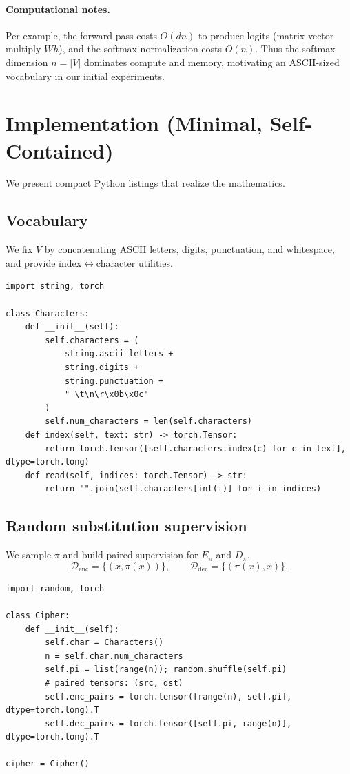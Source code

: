 \documentclass[12pt]{article}
\begin{document}
\paragraph{Computational notes.}
Per example, the forward pass costs $O(dn)$ to produce logits (matrix-vector multiply $W h$), and the softmax normalization costs $O(n)$. Thus the softmax dimension $n=|V|$ dominates compute and memory, motivating an ASCII-sized vocabulary in our initial experiments.

\section{Implementation (Minimal, Self-Contained)}
We present compact Python listings that realize the mathematics.

\subsection{Vocabulary}
We fix $V$ by concatenating ASCII letters, digits, punctuation, and whitespace, and provide index$\leftrightarrow$character utilities.
\begin{verbatim}
import string, torch

class Characters:
    def __init__(self):
        self.characters = (
            string.ascii_letters + 
            string.digits + 
            string.punctuation + 
            " \t\n\r\x0b\x0c"
        )
        self.num_characters = len(self.characters)
    def index(self, text: str) -> torch.Tensor:
        return torch.tensor([self.characters.index(c) for c in text], dtype=torch.long)
    def read(self, indices: torch.Tensor) -> str:
        return "".join(self.characters[int(i)] for i in indices)
\end{verbatim}

\subsection{Random substitution supervision}
We sample $\pi$ and build paired supervision for $E_\pi$ and $D_\pi$.
\[
\mathcal{D}_{\text{enc}}=\{(x,\pi(x))\},\qquad
\mathcal{D}_{\text{dec}}=\{(\pi(x),x)\}.
\]
\begin{verbatim}
import random, torch

class Cipher:
    def __init__(self):
        self.char = Characters()
        n = self.char.num_characters
        self.pi = list(range(n)); random.shuffle(self.pi)
        # paired tensors: (src, dst)
        self.enc_pairs = torch.tensor([range(n), self.pi], dtype=torch.long).T
        self.dec_pairs = torch.tensor([self.pi, range(n)], dtype=torch.long).T

cipher = Cipher()
\end{verbatim}
\end{document}
